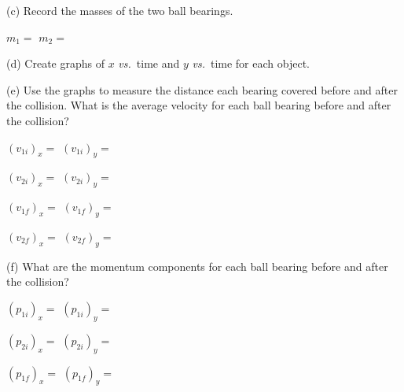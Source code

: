 
(c) Record the masses of the two ball bearings.
\vspace{5mm}

\( m_{1} =\)  \hfill{}\( m_{2} =\)  \hfill{}
\vspace{5mm}

(d) Create graphs of $x$ \textit{vs.}~time and $y$ \textit{vs.}~time for each object.
\vspace{7mm}


(e) Use the graphs to measure the distance each bearing covered before and after
the collision. What is the average velocity for each ball bearing before and
after the collision?
\vspace{7mm}

\( (v_{1i})_{x}= \) \hfill{}\( (v_{1i})_{y}= \)  \hfill{}
\vspace{7mm}

\( (v_{2i})_{x} =\)  \hfill{}\( (v_{2i})_{y}= \)  \hfill{}
\vspace{7mm}

\( (v_{1f})_{x} =\)  \hfill{}\( (v_{1f})_{y}= \)  \hfill{}
\vspace{7mm}

\((v_{2f})_{x} =\)  \hfill{}\( (v_{2f})_{y}= \)  \hfill{}
\vspace{7mm}


(f) What are the momentum components for each ball bearing before and after
the collision?
\vspace{7mm}

\( (p_{1i})_{x}= \) \hfill{}\( (p_{1i})_{y}= \)  \hfill{}
\vspace{7mm}

\( (p_{2i})_{x} =\)  \hfill{}\( (p_{2i})_{y}= \)  \hfill{}
\vspace{7mm}

\( (p_{1f})_{x} =\)  \hfill{}\( (p_{1f})_{y}= \)  \hfill{}
\vspace{7mm}

